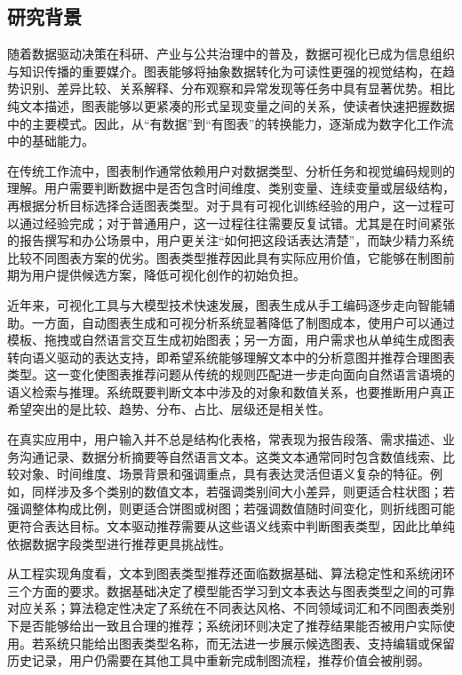 \subsection{研究背景}
随着数据驱动决策在科研、产业与公共治理中的普及，数据可视化已成为信息组织与知识传播的重要媒介。图表能够将抽象数据转化为可读性更强的视觉结构，在趋势识别、差异比较、关系解释、分布观察和异常发现等任务中具有显著优势。相比纯文本描述，图表能够以更紧凑的形式呈现变量之间的关系，使读者快速把握数据中的主要模式。因此，从“有数据”到“有图表”的转换能力，逐渐成为数字化工作流中的基础能力。

在传统工作流中，图表制作通常依赖用户对数据类型、分析任务和视觉编码规则的理解。用户需要判断数据中是否包含时间维度、类别变量、连续变量或层级结构，再根据分析目标选择合适图表类型。对于具有可视化训练经验的用户，这一过程可以通过经验完成；对于普通用户，这一过程往往需要反复试错。尤其是在时间紧张的报告撰写和办公场景中，用户更关注“如何把这段话表达清楚”，而缺少精力系统比较不同图表方案的优劣。图表类型推荐因此具有实际应用价值，它能够在制图前期为用户提供候选方案，降低可视化创作的初始负担。

近年来，可视化工具与大模型技术快速发展，图表生成从手工编码逐步走向智能辅助。一方面，自动图表生成和可视分析系统显著降低了制图成本，使用户可以通过模板、拖拽或自然语言交互生成初始图表；另一方面，用户需求也从单纯生成图表转向语义驱动的表达支持，即希望系统能够理解文本中的分析意图并推荐合理图表类型。这一变化使图表推荐问题从传统的规则匹配进一步走向面向自然语言语境的语义检索与推理。系统既要判断文本中涉及的对象和数值关系，也要推断用户真正希望突出的是比较、趋势、分布、占比、层级还是相关性。

在真实应用中，用户输入并不总是结构化表格，常表现为报告段落、需求描述、业务沟通记录、数据分析摘要等自然语言文本。这类文本通常同时包含数值线索、比较对象、时间维度、场景背景和强调重点，具有表达灵活但语义复杂的特征。例如，同样涉及多个类别的数值文本，若强调类别间大小差异，则更适合柱状图；若强调整体构成比例，则更适合饼图或树图；若强调数值随时间变化，则折线图可能更符合表达目标。文本驱动推荐需要从这些语义线索中判断图表类型，因此比单纯依据数据字段类型进行推荐更具挑战性。

从工程实现角度看，文本到图表类型推荐还面临数据基础、算法稳定性和系统闭环三个方面的要求。数据基础决定了模型能否学习到文本表达与图表类型之间的可靠对应关系；算法稳定性决定了系统在不同表达风格、不同领域词汇和不同图表类别下是否能够给出一致且合理的推荐；系统闭环则决定了推荐结果能否被用户实际使用。若系统只能给出图表类型名称，而无法进一步展示候选图表、支持编辑或保留历史记录，用户仍需要在其他工具中重新完成制图流程，推荐价值会被削弱。

